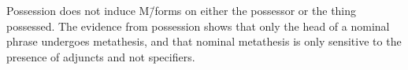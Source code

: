 Possession does not induce M\=/forms on either the possessor or the thing possessed.
The evidence from possession shows that only the head of a nominal phrase
undergoes metathesis, and that nominal metathesis is only sensitive to the presence
of adjuncts and not specifiers.

